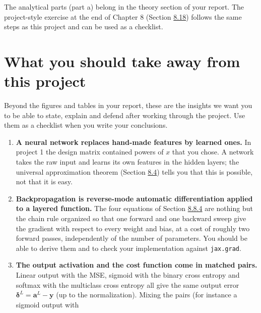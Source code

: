 \documentclass[11pt,a4paper]{article}
\begin{document}
The analytical parts (part a) belong in the theory section of your report.
The project-style exercise at the end of Chapter 8 (Section
\href{https://educationalmaterialuio.github.io/MachineLearningUiO/doc/LectureNotes/_build/html/chapter8.html#exercises}{8.18})
follows the same steps as this project and can be used as a checklist.

\section*{What you should take away from this project}

Beyond the figures and tables in your report, these are the insights we
want you to be able to state, explain and defend after working through
the project.  Use them as a checklist when you write your conclusions.
\begin{enumerate}[nosep]
  \item \textbf{A neural network replaces hand-made features by learned
        ones.}  In project 1 the design matrix contained powers of $x$ that
        you chose.  A network takes the raw input and learns its own
        features in the hidden layers; the universal approximation theorem
        (Section
        \href{https://educationalmaterialuio.github.io/MachineLearningUiO/doc/LectureNotes/_build/html/chapter8.html#the-universal-approximation-theorem}{8.4})
        tells you that this is possible, not that it is easy.
  \item \textbf{Backpropagation is reverse-mode automatic differentiation
        applied to a layered function.}  The four equations of Section
        \href{https://educationalmaterialuio.github.io/MachineLearningUiO/doc/LectureNotes/_build/html/chapter8.html#the-four-equations-of-backpropagation}{8.8.4}
        are nothing but the chain rule organized so that one forward and one
        backward sweep give the gradient with respect to every weight and
        bias, at a cost of roughly two forward passes, independently of the
        number of parameters.  You should be able to derive them and to check
        your implementation against \texttt{jax.grad}.
  \item \textbf{The output activation and the cost function come in matched
        pairs.}  Linear output with the MSE, sigmoid with the binary cross
        entropy and softmax with the multiclass cross entropy all give the
        same output error $\bm{\delta}^L=\bm{a}^L-\bm{y}$ (up to the
        normalization).  Mixing the pairs (for instance a sigmoid output with

\end{enumerate}
\end{document}
